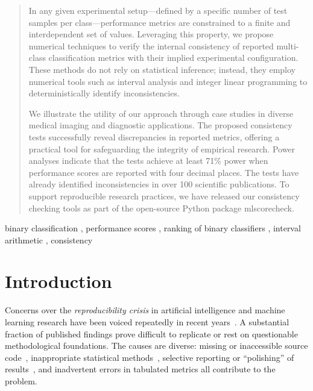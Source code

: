 \documentclass[3p, times]{elsarticle}
\begin{document}
\begin{frontmatter}
\begin{abstract}
In any given experimental setup—defined by a specific number of test samples per class—performance metrics are constrained to a finite and interdependent set of values. Leveraging this property, we propose numerical techniques to verify the internal consistency of reported multi-class classification metrics with their implied experimental configuration. These methods do not rely on statistical inference; instead, they employ numerical tools such as interval analysis and integer linear programming to deterministically identify inconsistencies.

We illustrate the utility of our approach through case studies in diverse medical imaging and diagnostic applications. The proposed consistency tests successfully reveal discrepancies in reported metrics, offering a practical tool for safeguarding the integrity of empirical research. Power analyses indicate that the tests achieve at least 71\% power when performance scores are reported with four decimal places. The tests have already identified inconsistencies in over 100 scientific publications. To support reproducible research practices, we have released our consistency checking tools as part of the open-source Python package mlscorecheck.

\end{abstract}

\begin{keyword}
binary classification
\sep 
performance scores
\sep
ranking of binary classifiers
\sep 
interval arithmetic
\sep
consistency
\end{keyword}


\end{frontmatter}
        


\thispagestyle{empty}

\section{Introduction}\label{section:Introduction}

Concerns over the \emph{reproducibility crisis} in artificial intelligence and machine learning research have been voiced repeatedly in recent years~\cite{leakage, reprcrisis, repr0, repr1}. A substantial fraction of published findings prove difficult to replicate or rest on questionable methodological foundations. The causes are diverse: missing or inaccessible source code~\cite{leakage}, inappropriate statistical methods~\cite{leakage, staterrors}, selective reporting or ``polishing'' of results~\cite{fabrication}, and inadvertent errors in tabulated metrics all contribute to the problem.
\end{document}
